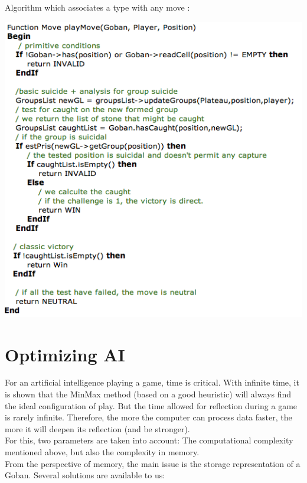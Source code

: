 \documentclass[11pt,a4paper]{report}
\begin{document}
\newpage 

Algorithm which associates a type with any move :

\begin{center}
\includegraphics[scale=0.60]{images/playMove.png}
\end{center}

\chapter*{Optimizing AI}
 

For an artificial intelligence playing a game, time is critical. With infinite time, it is shown that the MinMax method (based on a good heuristic) will always find the ideal configuration of play. But the time allowed for reflection during a game is rarely infinite. Therefore, the more the computer can process data faster, the more it will deepen its reflection (and be stronger). \\

For this, two parameters are taken into account: The computational complexity mentioned above, but also the complexity in memory. \\

From the perspective of memory, the main issue is the storage representation of a Goban. Several solutions are available to us: \\
     
\end{document}
